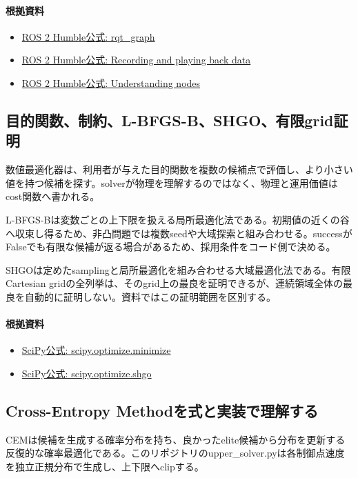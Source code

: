 \documentclass[a4paper,11pt]{article}
\begin{document}
\paragraph{根拠資料}
\begin{itemize}[leftmargin=1.6em]
\item \href{https://docs.ros.org/en/ros2_packages/humble/api/rqt_graph/index.html}{ROS 2 Humble公式: rqt\_graph}
\item \href{https://docs.ros.org/en/humble/Tutorials/Beginner-CLI-Tools/Recording-And-Playing-Back-Data/Recording-And-Playing-Back-Data.html}{ROS 2 Humble公式: Recording and playing back data}
\item \href{https://docs.ros.org/en/humble/Tutorials/Beginner-CLI-Tools/Understanding-ROS2-Nodes/Understanding-ROS2-Nodes.html}{ROS 2 Humble公式: Understanding nodes}
\end{itemize}

\subsection{目的関数、制約、L-BFGS-B、SHGO、有限grid証明}
数値最適化器は、利用者が与えた目的関数を複数の候補点で評価し、より小さい値を持つ候補を探す。solverが物理を理解するのではなく、物理と運用価値はcost関数へ書かれる。


L-BFGS-Bは変数ごとの上下限を扱える局所最適化法である。初期値の近くの谷へ収束し得るため、非凸問題では複数seedや大域探索と組み合わせる。successがFalseでも有限な候補が返る場合があるため、採用条件をコード側で決める。


SHGOは定めたsamplingと局所最適化を組み合わせる大域最適化法である。有限Cartesian gridの全列挙は、そのgrid上の最良を証明できるが、連続領域全体の最良を自動的に証明しない。資料ではこの証明範囲を区別する。

\paragraph{根拠資料}
\begin{itemize}[leftmargin=1.6em]
\item \href{https://docs.scipy.org/doc/scipy/reference/generated/scipy.optimize.minimize.html}{SciPy公式: scipy.optimize.minimize}
\item \href{https://docs.scipy.org/doc/scipy/reference/generated/scipy.optimize.shgo.html}{SciPy公式: scipy.optimize.shgo}
\end{itemize}

\subsection{Cross-Entropy Methodを式と実装で理解する}
CEMは候補を生成する確率分布を持ち、良かったelite候補から分布を更新する反復的な確率最適化である。このリポジトリのupper\_solver.pyは各制御点速度を独立正規分布で生成し、上下限へclipする。
\end{document}
